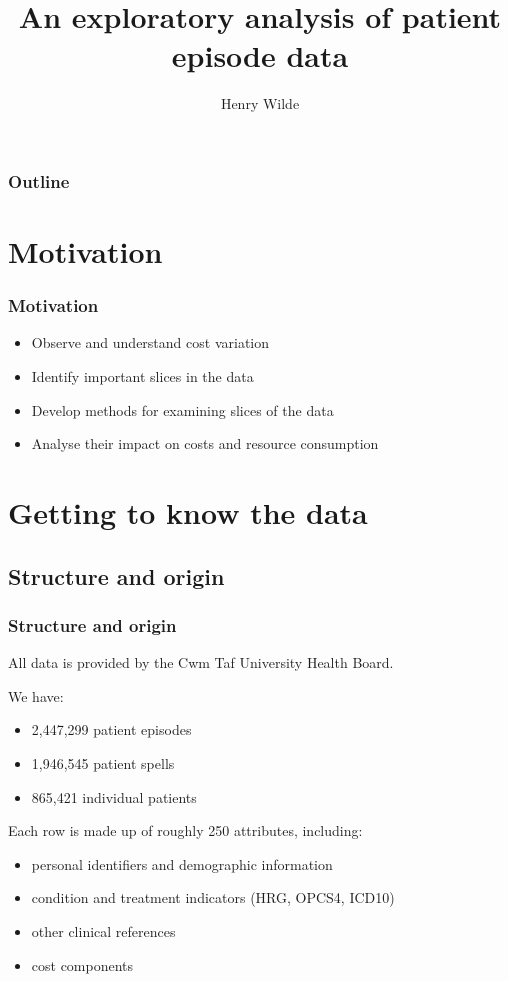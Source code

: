 \documentclass{beamer}
\title{An exploratory analysis of patient episode data}
\author{Henry Wilde}
\institute{Cardiff University School of Mathematics}
\begin{document}
\begin{frame}
\titlepage%
\end{frame}

\begin{frame}
\frametitle{Outline}
\tableofcontents
\end{frame}

\section{Motivation}

\begin{frame}
\frametitle{Motivation}

\begin{itemize}
    \item Observe and understand cost variation
    \item Identify important slices in the data
    \item Develop methods for examining slices of the data
    \item Analyse their impact on costs and resource consumption
\end{itemize}
\end{frame}

\section{Getting to know the data}

\subsection{Structure and origin}
\begin{frame}
    \frametitle{Structure and origin}

    \pause%
    All data is provided by the Cwm Taf University Health Board.
    \vspace{10pt}

    \pause%
    We have:
    \begin{itemize}
        \item 2,447,299 patient episodes
        \item 1,946,545 patient spells
        \item 865,421 individual patients
    \end{itemize}
    \vspace{10pt}

    \pause%
    Each row is made up of roughly 250 attributes, including:
    \begin{itemize}
        \pause%
        \item personal identifiers and demographic information
        \pause%
        \item condition and treatment indicators (HRG, OPCS4, ICD10)
        \pause%
        \item other clinical references
        \pause%
        \item cost components
    \end{itemize}
\end{frame}
\end{document}
